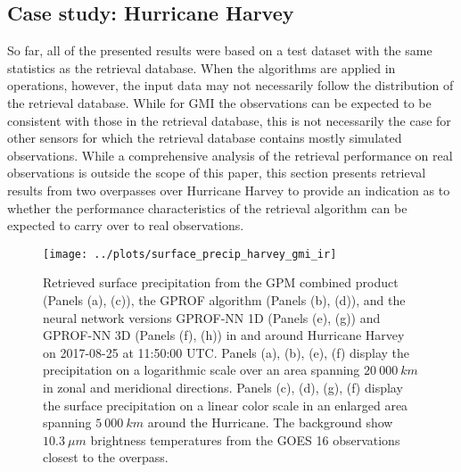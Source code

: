 \documentclass[a4paper,11pt,bibtotoc]{scrartcl}
\begin{document}
\subsection{Case study: Hurricane Harvey}

So far, all of the presented results were based on a test dataset with the same
statistics as the retrieval database. When the algorithms are applied in
operations, however, the input data may not necessarily follow the distribution
of the retrieval database. While for GMI the observations can be expected to be
consistent with those in the retrieval database, this is not necessarily the
case for other sensors for which the retrieval database contains mostly
simulated observations. While a comprehensive analysis of the retrieval
performance on real observations is outside the scope of this paper, this
section presents retrieval results from two overpasses over Hurricane Harvey to
provide an indication as to whether the performance characteristics of the
retrieval algorithm can be expected to carry over to real observations.

\begin{figure}[hbpt]
  \centering
  \texttt{[image: ../plots/surface\_precip\_harvey\_gmi\_ir]}
  \caption{ Retrieved surface precipitation from the GPM combined product
    (Panels (a), (c)), the GPROF algorithm (Panels (b), (d)), and the neural
    network versions GPROF-NN 1D (Panels (e), (g)) and GPROF-NN 3D (Panels (f),
    (h)) in and around Hurricane Harvey on 2017-08-25 at 11:50:00 UTC. Panels
    (a), (b), (e), (f) display the precipitation on a logarithmic scale over an
    area spanning $20\ 000\ \unit{km}$ in zonal and meridional directions.
    Panels (c), (d), (g), (f) display the surface precipitation on a linear
    color scale in an enlarged area spanning $5\ 000\ \unit{km}$ around the
    Hurricane. The background show $10.3\ \unit{\mu m}$ brightness temperatures
    from the GOES 16 observations closest to the overpass.
  }
  \label{fig:harvey_gmi}
\end{figure}
\end{document}
